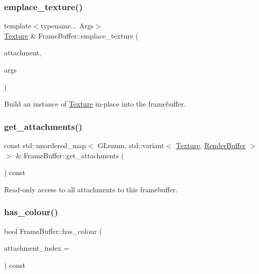 \subsubsection{\texorpdfstring{emplace\+\_\+texture()}{emplace\_texture()}}
{\footnotesize\ttfamily template$<$typename... Args$>$ \\
\mbox{\hyperlink{class_texture}{Texture}} \& Frame\+Buffer\+::emplace\+\_\+texture (\begin{DoxyParamCaption}\item[{G\+Lenum}]{attachment,  }\item[{Args \&\&...}]{args }\end{DoxyParamCaption})}

Build an instance of \mbox{\hyperlink{class_texture}{Texture}} in-\/place into the framebuffer. \mbox{\label{class_frame_buffer_a68f6da84fd228eb6edc786e9e5ea02ad}} 
\subsubsection{\texorpdfstring{get\+\_\+attachments()}{get\_attachments()}}
{\footnotesize\ttfamily const std\+::unordered\+\_\+map$<$ G\+Lenum, std\+::variant$<$ \mbox{\hyperlink{class_texture}{Texture}}, \mbox{\hyperlink{class_render_buffer}{Render\+Buffer}} $>$ $>$ \& Frame\+Buffer\+::get\+\_\+attachments (\begin{DoxyParamCaption}{ }\end{DoxyParamCaption}) const}

Read-\/only access to all attachments to this framebuffer. \mbox{\label{class_frame_buffer_ac29ea4f3bed89d0ee1dc68311855caa8}} 
\subsubsection{\texorpdfstring{has\+\_\+colour()}{has\_colour()}}
{\footnotesize\ttfamily bool Frame\+Buffer\+::has\+\_\+colour (\begin{DoxyParamCaption}\item[{unsigned int}]{attachment\+\_\+index = {} }\end{DoxyParamCaption}) const}

